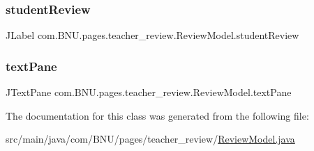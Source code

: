 \subsubsection{\texorpdfstring{student\+Review}{studentReview}}
{\footnotesize\ttfamily J\+Label com.\+B\+N\+U.\+pages.\+teacher\+\_\+review.\+Review\+Model.\+student\+Review\hspace{0.3cm}{\ttfamily [private]}}

\mbox{\label{classcom_1_1_b_n_u_1_1pages_1_1teacher__review_1_1_review_model_a4fc16baa5ddf9da68c6a6bc189d829d5}} 
\subsubsection{\texorpdfstring{text\+Pane}{textPane}}
{\footnotesize\ttfamily J\+Text\+Pane com.\+B\+N\+U.\+pages.\+teacher\+\_\+review.\+Review\+Model.\+text\+Pane\hspace{0.3cm}{\ttfamily [private]}}



The documentation for this class was generated from the following file\+:\begin{DoxyCompactItemize}
\item 
src/main/java/com/\+B\+N\+U/pages/teacher\+\_\+review/\mbox{\hyperlink{teacher__review_2_review_model_8java}{Review\+Model.\+java}}\end{DoxyCompactItemize}
